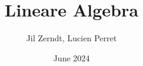 \documentclass[a4paper, fontsize = 8pt, landscape]{scrartcl}
\title{Lineare Algebra}
\author{Jil Zerndt, Lucien Perret}
\date{June 2024}
\begin{document}
\begin{multicols*}{3}
    \thispagestyle{TitlePageStyle}
		\maketitle
    
    \raggedcolumns
    \columnbreak
    
    \raggedcolumns
    \newpage
    
    \raggedcolumns
    
    \raggedcolumns
    
    \raggedcolumns
    
    \raggedcolumns
    
    

\end{multicols*}
\end{document}
